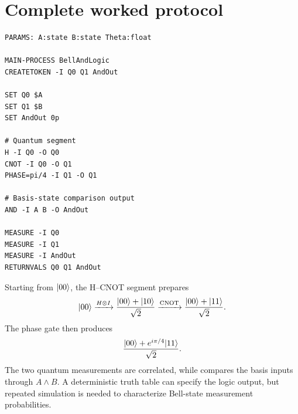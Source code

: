 \section{Complete worked protocol}

\begin{lstlisting}
PARAMS: A:state B:state Theta:float

MAIN-PROCESS BellAndLogic
CREATETOKEN -I Q0 Q1 AndOut

SET Q0 $A
SET Q1 $B
SET AndOut 0p

# Quantum segment
H -I Q0 -O Q0
CNOT -I Q0 -O Q1
PHASE=pi/4 -I Q1 -O Q1

# Basis-state comparison output
AND -I A B -O AndOut

MEASURE -I Q0
MEASURE -I Q1
MEASURE -I AndOut
RETURNVALS Q0 Q1 AndOut
\end{lstlisting}

Starting from $\lvert 00\rangle$, the H--CNOT segment prepares
\[
\lvert 00\rangle\xrightarrow{H\otimes I}
\frac{\lvert 00\rangle+\lvert 10\rangle}{\sqrt2}
\xrightarrow{\mathrm{CNOT}}
\frac{\lvert 00\rangle+\lvert 11\rangle}{\sqrt2}.
\]
The phase gate then produces
\[
\frac{\lvert 00\rangle+e^{i\pi/4}\lvert 11\rangle}{\sqrt2}.
\]
The two quantum measurements are correlated, while  compares the
basis inputs through $A\land B$. A deterministic truth table can specify the
logic output, but repeated simulation is needed to characterize Bell-state
measurement probabilities.

